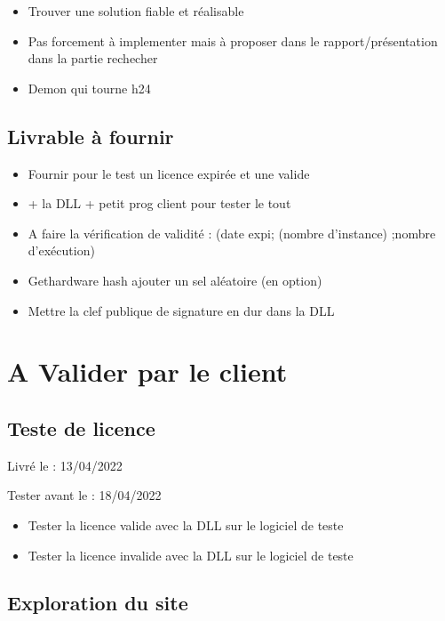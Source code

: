 \documentclass{article}
\begin{document}
\begin{itemize}
    \item Trouver une solution fiable et réalisable 
    \item Pas forcement à implementer mais à proposer dans le rapport/présentation dans la partie rechecher
    \item Demon qui tourne h24
\end{itemize}

\subsection{Livrable à fournir}

\begin{itemize}
    \item Fournir pour le test un licence expirée et une valide 
    \item + la DLL + petit prog client pour tester le tout
    \item A faire la vérification de validité : (date expi; (nombre d'instance) ;nombre d'exécution)
    \item Gethardware hash ajouter un sel aléatoire (en option)
    \item Mettre la clef publique de signature en dur dans la DLL
\end{itemize}
\newpage

\section{A Valider par le client}
\subsection{Teste de licence}

Livré le : 13/04/2022

Tester avant le : 18/04/2022\\

\begin{itemize}
     \item Tester la licence valide avec la DLL sur le logiciel de teste
     \item Tester la licence invalide avec la DLL sur le logiciel de teste
\end{itemize}

\subsection{Exploration du site}
\end{document}
